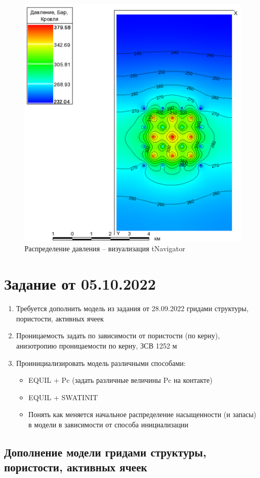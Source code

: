 \documentclass[a4paper,12pt]{article}
\begin{document}
\begin{figure}[H]
\center
\includegraphics[width=.6\textwidth]{tnav_head_box_pressure_map}
\caption{Распределение давления -- визуализация tNavigator}
\label{fig:tnav_fwct_box_model}
\end{figure}


\newpage
\section{Задание от 05.10.2022}

\begin{enumerate}
	\item Требуется дополнить модель из задания от 28.09.2022 гридами структуры, пористости, активных ячеек
	\item Проницаемость задать по зависимости от пористости (по керну), анизотропию проницаемости по керну, ЗСВ 1252 м
	\item Проинициализировать модель различными способами:
	\begin{itemize}
		\item EQUIL + Pc (задать различные величины Pc на контакте)
		\item EQUIL + SWATINIT
		\item Понять как меняется начальное распределение насыщенности (и запасы) в модели в зависимости от способа инициализации
	\end{itemize}
\end{enumerate}

\subsection{Дополнение модели гридами структуры, пористости, активных ячеек}
\end{document}
